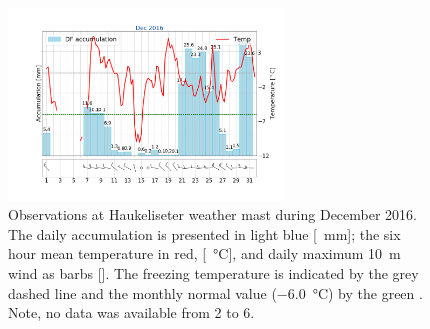 \begin{figure}[!b]
	\centering
	\includegraphics[trim={4.cm 3.3cm 1.5cm 3.cm},clip,
	width=0.65\textwidth]{./fig_weathermast/T_P_U_201612}
	\caption{Observations at Haukeliseter weather mast during December 2016. 
		The daily accumulation is presented in light blue [\SI{}{\mm}]; the six hour mean temperature in red, [\SI{}{\celsius}], and daily maximum \SI{10}{\metre} wind as barbs [\SI{}{\mPs}]. The freezing temperature is indicated by the grey dashed line and the monthly normal value (\SI{-6.0}{\celsius}) by the green \citep{eklima_norwegian_2016}. Note, no data was available from \num{2} to \SI{6}{\dec}.} \label{fig:DecObs}
\end{figure}